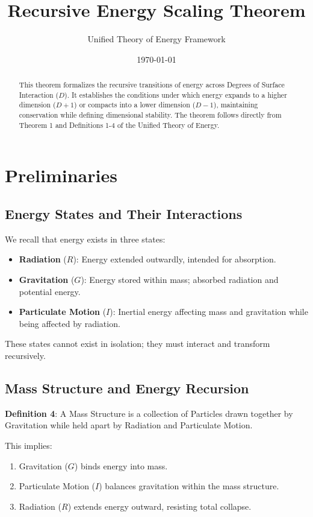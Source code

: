 \documentclass{article}
\title{Recursive Energy Scaling Theorem}
\author{Unified Theory of Energy Framework}
\date{\today}
\begin{document}
\maketitle

\begin{abstract}
This theorem formalizes the recursive transitions of energy across Degrees of Surface Interaction ($D$). It establishes the conditions under which energy expands to a higher dimension ($D+1$) or compacts into a lower dimension ($D-1$), maintaining conservation while defining dimensional stability. The theorem follows directly from Theorem 1 and Definitions 1-4 of the Unified Theory of Energy.
\end{abstract}

\section{Preliminaries}

\subsection{Energy States and Their Interactions}
We recall that energy exists in three states:

\begin{itemize}
    \item \textbf{Radiation} ($R$): Energy extended outwardly, intended for absorption.
    \item \textbf{Gravitation} ($G$): Energy stored within mass; absorbed radiation and potential energy.
    \item \textbf{Particulate Motion} ($I$): Inertial energy affecting mass and gravitation while being affected by radiation.
\end{itemize}

These states cannot exist in isolation; they must interact and transform recursively.

\subsection{Mass Structure and Energy Recursion}
\textbf{Definition 4}: A Mass Structure is a collection of Particles drawn together by Gravitation while held apart by Radiation and Particulate Motion.

This implies:
\begin{enumerate}
    \item Gravitation ($G$) binds energy into mass.
    \item Particulate Motion ($I$) balances gravitation within the mass structure.
    \item Radiation ($R$) extends energy outward, resisting total collapse.
\end{enumerate}
\end{document}
